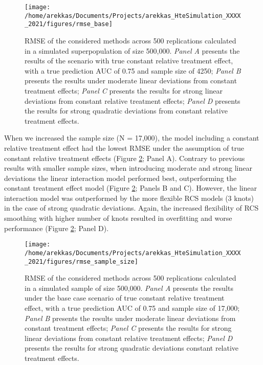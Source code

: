 \documentclass{article}
\begin{document}
\begin{figure}
\texttt{[image: /home/arekkas/Documents/Projects/arekkas\_HteSimulation\_XXXX\_2021/figures/rmse\_base]} \caption{RMSE of the considered methods across 500 replications calculated in a simulated superpopulation of size 500,000. \textit{Panel A} presents the results of the scenario with true constant relative treatment effect, with a true prediction AUC of 0.75 and sample size of 4250; \textit{Panel B} presents the results under moderate linear deviations from constant treatment effects; \textit{Panel C} presents the results for strong linear deviations from constant relative treatment effects; \textit{Panel D} presents the results for strong quadratic deviations from constant relative treatment effects.}\label{fig:rmsebase}
\end{figure}

When we increased the sample size (N = 17,000), the model including a
constant relative treatment effect had the lowest RMSE under the
assumption of true constant relative treatment effects (Figure
\ref{fig:rmsesamplesize}; Panel A). Contrary to previous results with
smaller sample sizes, when introducing moderate and strong linear
deviations the linear interaction model performed best, outperforming
the constant treatment effect model (Figure \ref{fig:rmsesamplesize};
Panels B and C). However, the linear interaction model was outperformed
by the more flexible RCS models (3 knots) in the case of strong
quadratic deviations. Again, the increased flexibility of RCS smoothing
with higher number of knots resulted in overfitting and worse
performance (Figure \ref{fig:rmsesamplesize}; Panel D).

\begin{figure}
\texttt{[image: /home/arekkas/Documents/Projects/arekkas\_HteSimulation\_XXXX\_2021/figures/rmse\_sample\_size]} \caption{RMSE of the considered methods across 500 replications calculated in a simulated sample of size 500,000. \textit{Panel A} presents the results under the base case scenario of true constant relative treatment effect, with a true prediction AUC of 0.75 and sample size of 17,000; \textit{Panel B} presents the results under moderate linear deviations from constant treatment effects; \textit{Panel C} presents the results for strong linear deviations from constant relative treatment effects; \textit{Panel D} presents the results for strong quadratic deviations constant relative treatment effects.}\label{fig:rmsesamplesize}
\end{figure}
\end{document}
